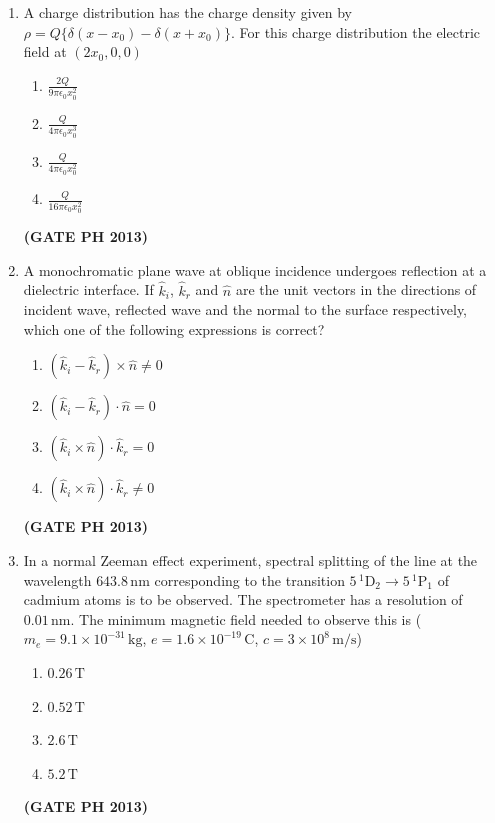 \documentclass[14pt, a4paper]{extarticle}
\begin{document}
\begin{enumerate}[label=\textbf{Q. \arabic*}]
\item A charge distribution has the charge density given by $\rho = Q\{\delta(x - x_0) - \delta(x + x_0)\}$. For this charge distribution the electric field at $(2x_0, 0,0)$
\begin{multicols}{4}
    \begin{enumerate}
        \item $\frac{2Q}{9\pi\epsilon_0x_0^2}$
        \item $\frac{Q}{4\pi\epsilon_0x_0^3}$
        \item $\frac{Q}{4\pi\epsilon_0x_0^2}$
        \item $\frac{Q}{16\pi\epsilon_0x_0^2}$
    \end{enumerate}
\end{multicols}
\hfill \textbf{(GATE PH 2013)}

\item A monochromatic plane wave at oblique incidence undergoes reflection at a dielectric interface. If $\hat{k}_i$, $\hat{k}_r$ and $\hat{n}$ are the unit vectors in the directions of incident wave, reflected wave and the normal to the surface respectively, which one of the following expressions is correct?
\begin{multicols}{2}
    \begin{enumerate}
        \item $(\hat{k}_i - \hat{k}_r) \times \hat{n} \ne 0$
        \item $(\hat{k}_i - \hat{k}_r) \cdot \hat{n} = 0$
        \item $(\hat{k}_i \times \hat{n}) \cdot \hat{k}_r = 0$
        \item $(\hat{k}_i \times \hat{n}) \cdot \hat{k}_r \ne 0$
    \end{enumerate}
\end{multicols}
\hfill \textbf{(GATE PH 2013)}

\item In a normal Zeeman effect experiment, spectral splitting of the line at the wavelength $643.8\,\text{nm}$ corresponding to the transition $5\,^1\text{D}_2 \to 5\,^1\text{P}_1$ of cadmium atoms is to be observed. The spectrometer has a resolution of $0.01\,\text{nm}$. The minimum magnetic field needed to observe this is ($m_e = 9.1 \times 10^{-31}\,\text{kg}$, $e = 1.6 \times 10^{-19}\,\text{C}$, $c = 3 \times 10^8\,\text{m/s}$)
\begin{multicols}{4}
    \begin{enumerate}
        \item $0.26\,\text{T}$
        \item $0.52\,\text{T}$
        \item $2.6\,\text{T}$
        \item $5.2\,\text{T}$
    \end{enumerate}
\end{multicols}
\hfill \textbf{(GATE PH 2013)}


\end{enumerate}
\end{document}
